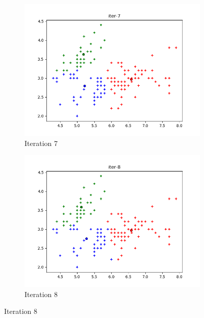 \documentclass[french]{article}
\begin{document}
\begin{figure}[h!]
\centering
\begin{subfigure}{.5\textwidth}
  \centering
  \includegraphics[width=\linewidth]{img/iter-7.png}
  \caption{Iteration 7}
\end{subfigure}%
\begin{subfigure}{.5\textwidth}
  \centering
  \includegraphics[width=\linewidth]{img/iter-8.png}
  \caption{Iteration 8}
\end{subfigure}%
\end{figure}


\newpage
\end{document}
